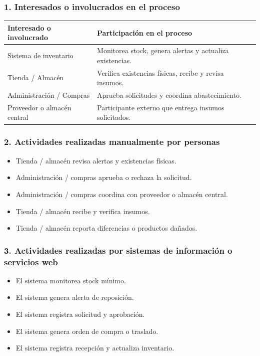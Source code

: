 \documentclass[a4paper,12pt]{article}
\begin{document}
\subsubsection*{1. Interesados o involucrados en el proceso}

\begin{longtable}{P{5cm} P{9cm}}
\toprule
\textbf{Interesado o involucrado} & \textbf{Participación en el proceso} \\
\midrule
Sistema de inventario & Monitorea stock, genera alertas y actualiza existencias. \\
Tienda / Almacén & Verifica existencias físicas, recibe y revisa insumos. \\
Administración / Compras & Aprueba solicitudes y coordina abastecimiento. \\
Proveedor o almacén central & Participante externo que entrega insumos solicitados. \\
\bottomrule
\end{longtable}

\subsubsection*{2. Actividades realizadas manualmente por personas}

\begin{itemize}
    \item Tienda / almacén revisa alertas y existencias físicas.
    \item Administración / compras aprueba o rechaza la solicitud.
    \item Administración / compras coordina con proveedor o almacén central.
    \item Tienda / almacén recibe y verifica insumos.
    \item Tienda / almacén reporta diferencias o productos dañados.
\end{itemize}

\subsubsection*{3. Actividades realizadas por sistemas de información o servicios web}

\begin{itemize}
    \item El sistema monitorea stock mínimo.
    \item El sistema genera alerta de reposición.
    \item El sistema registra solicitud y aprobación.
    \item El sistema genera orden de compra o traslado.
    \item El sistema registra recepción y actualiza inventario.
\end{itemize}
\end{document}

